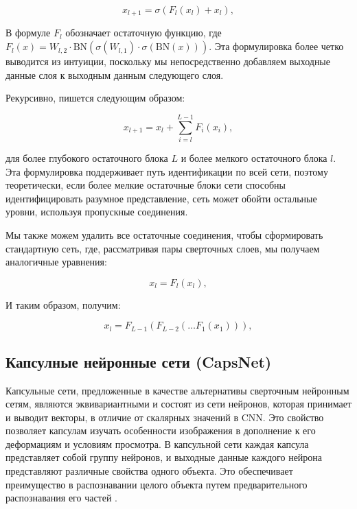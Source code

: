 \begin{equation}
    x_{l + 1} = \sigma(F_{l}(x_{l}) + x_{l})
, \end{equation}

В формуле \(F_{l}\) обозначает остаточную функцию, где \(F_{l}(x) = W_{l,2} \cdot \text{BN}(\sigma(W_{l,1}) \cdot \sigma(\text{BN}(x)))\). Эта формулировка более четко выводится из интуиции, поскольку мы непосредственно добавляем выходные данные слоя к выходным данным следующего слоя.

Рекурсивно, пишется следующим образом:

\begin{equation}
    x_{l + 1} = x_{l} + \sum_{i = l}^{L - 1} F_{i}(x_{i})
, \end{equation}

для более глубокого остаточного блока \(L\) и более мелкого остаточного блока \(l\). Эта формулировка поддерживает путь идентификации по всей сети, поэтому теоретически, если более мелкие остаточные блоки сети способны идентифицировать разумное представление, сеть может обойти остальные уровни, используя пропускные соединения.

Мы также можем удалить все остаточные соединения, чтобы сформировать стандартную сеть, где, рассматривая пары сверточных слоев, мы получаем аналогичные уравнения:

\begin{equation}
    x_{l} = F_{l}(x_{l})
, \end{equation}

И таким образом, получим:

\begin{equation}
    x_{l} = F_{L - 1}(F_{L - 2}(\ldots F_{1}(x_{1})))
, \end{equation}

\subsection{Капсулные нейронные сети (CapsNet)}

Капсульные сети, предложенные в качестве альтернативы сверточным нейронным сетям, являются эквивариантными и состоят из сети нейронов, которая принимает и выводит векторы, в отличие от скалярных значений в CNN. Это свойство позволяет капсулам изучать особенности изображения в дополнение к его деформациям и условиям просмотра. В капсульной сети каждая капсула представляет собой группу нейронов, и выходные данные каждого нейрона представляют различные свойства одного объекта. Это обеспечивает преимущество в распознавании целого объекта путем предварительного распознавания его частей \cite{lecun2015deep}.

